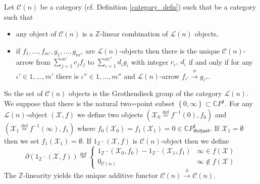 \documentclass{beamer}
\theoremstyle{plain}
\newcommand{\Z}{\mathbb{Z}}
\newcommand{\be}{\begin{equation}}
\newcommand{\ee}{\end{equation}}
\newcommand{\C}{\mathbb{C}}
\newcommand{\sX}{\mathcal{X}}       %
\newcommand{\bydef}{\stackrel{\mathrm{def}}{=}}
\begin{document}
\begin{frame}
Let $\mathscr{C}\left(n \right)$ be a category (cf. Definition \ref{category_defn}) such that
be a category such that
\begin{itemize}
	\item any object of $\mathscr{C}\left(n \right)$ is a $\Z$-linear combination of $\mathscr{L}\left(n \right)$ objects,
	\item if $f_1, ..., f_{m'}, g_1, ..., g_{m''}$ are $\mathscr{L}\left(n \right)$-objects then there is the unique  $\mathscr{C}\left(n \right)$-arrow from $\sum_{j = 1}^{m'}c_j f_j$ to $\sum_{\iota = 1}^{m''}d_\iota g_\iota$ with integer $c_\iota, ~d_\iota$ if and only if for any $\iota' \in 1,..., m'$ there is  $\iota'' \in 1,..., m''$ and $\mathscr{L}\left(n \right)$-arrow $f_{\iota'}\xrightarrow{\phi} g_{\iota''}$.
\end{itemize}
So the set of $\mathscr{C}\left(n \right)$ objects is the Grothendieck group of the category $\mathscr{L}\left(n \right)$.
We suppose that there is the natural two=point subset $\left\{0, \infty\right\}\subset \C P^1$. For any $\mathscr{L}\left(n \right)$-object $\left(\sX, f \right)$ we define two objects $\left(\sX_0\bydef f^{-1}\left(0 \right) , f_0 \right)$  and $\left(\sX_1\bydef f^{-1}\left(\infty \right) , f_1 \right)$ where $f_0\left(\sX_0 \right) = f_1\left(\sX_1 \right)= {0} \in \C P^1_{\mathfrak{Gelfand}}$. If $\sX_1 = \emptyset$ then we set $f_1\left(\sX_1 \right)= \emptyset$.
If $1_\Z \cdot \left(\sX, f \right)$ is $\mathscr{C}\left(n \right)$-object then we define
\be\label{co_d_eqn}
\partial \left( 1_\Z \cdot \left(\sX, f \right)\right)  \bydef \begin{cases}
	1_\Z \cdot \left(\sX_0, f_0 \right) - 1_\Z \cdot \left(\sX_1, f_1 \right) & \infty \in f\left(\sX \right) \\
	0_{\mathscr{C}\left(n \right)} &  \infty \notin f\left(\sX \right)
\end{cases}
\ee 
The $\Z$-linearity yields the unique additive  functor $\mathscr{C}\left(n \right)\xrightarrow{\partial} \mathscr{C}\left(n \right)$.
\end{frame}
\end{document}
